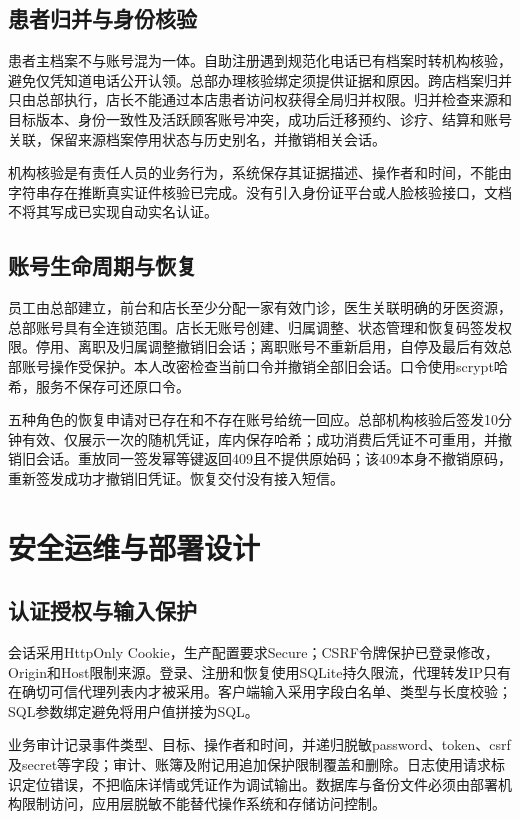 \documentclass[UTF8,12pt,a4paper,fontset=none]{ctexart}
\begin{document}
\subsection{患者归并与身份核验}
患者主档案不与账号混为一体。自助注册遇到规范化电话已有档案时转机构核验，避免仅凭知道电话公开认领。总部办理核验绑定须提供证据和原因。跨店档案归并只由总部执行，店长不能通过本店患者访问权获得全局归并权限。归并检查来源和目标版本、身份一致性及活跃顾客账号冲突，成功后迁移预约、诊疗、结算和账号关联，保留来源档案停用状态与历史别名，并撤销相关会话。\par
机构核验是有责任人员的业务行为，系统保存其证据描述、操作者和时间，不能由字符串存在推断真实证件核验已完成。没有引入身份证平台或人脸核验接口，文档不将其写成已实现自动实名认证。\par
\subsection{账号生命周期与恢复}
员工由总部建立，前台和店长至少分配一家有效门诊，医生关联明确的牙医资源，总部账号具有全连锁范围。店长无账号创建、归属调整、状态管理和恢复码签发权限。停用、离职及归属调整撤销旧会话；离职账号不重新启用，自停及最后有效总部账号操作受保护。本人改密检查当前口令并撤销全部旧会话。口令使用scrypt哈希，服务不保存可还原口令。\par
五种角色的恢复申请对已存在和不存在账号给统一回应。总部机构核验后签发10分钟有效、仅展示一次的随机凭证，库内保存哈希；成功消费后凭证不可重用，并撤销旧会话。重放同一签发幂等键返回409且不提供原始码；该409本身不撤销原码，重新签发成功才撤销旧凭证。恢复交付没有接入短信。\par
{}
\section{安全运维与部署设计}
\subsection{认证授权与输入保护}
会话采用HttpOnly Cookie，生产配置要求Secure；CSRF令牌保护已登录修改，Origin和Host限制来源。登录、注册和恢复使用SQLite持久限流，代理转发IP只有在确切可信代理列表内才被采用。客户端输入采用字段白名单、类型与长度校验；SQL参数绑定避免将用户值拼接为SQL。\par
业务审计记录事件类型、目标、操作者和时间，并递归脱敏password、token、csrf及secret等字段；审计、账簿及附记用追加保护限制覆盖和删除。日志使用请求标识定位错误，不把临床详情或凭证作为调试输出。数据库与备份文件必须由部署机构限制访问，应用层脱敏不能替代操作系统和存储访问控制。\par
\Needspace{575pt}
\end{document}
